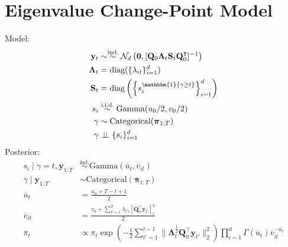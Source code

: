 \documentclass{article}
\newcommand\indep{\perp\!\!\!\perp}
\begin{document}
\section{Eigenvalue Change-Point Model}
Model:
\begin{align*}
    \mathbf{y}_t &\sim \overset{\text{ind.}}{\sim} \mathcal{N}_d \left(\mathbf{0}, [\mathbf{Q}_0 \boldsymbol{\Lambda}_t\mathbf{S}_t\mathbf{Q}_0^\intercal]^{-1}\right) \\
    \boldsymbol{\Lambda}_t &= \text{diag}(\{\lambda_{it} \}_{i=1}^d) \\
    \mathbf{S}_t &= \text{diag}\left(\left\{s_i^{\mathbbm{1}\{\gamma \geq t\}}\right\}_{i=1}^d\right) \\
    s_i &\overset{\text{i.i.d.}}{\sim} \text{Gamma}(u_0/2, v_0/2) \\
    \gamma &\sim \text{Categorical}(\boldsymbol{\pi}_{1:T}) \\
    \gamma &\indep \{s_i\}_{i=1}^d 
\end{align*}
Posterior:
\begin{align*}
    s_i \;|\; \gamma = t, \mathbf{y}_{1:T} &\overset{\text{ind.}}{\sim} \text{Gamma}(\overline{u}_t, \overline{v}_{it}) \\
    \gamma \;|\; \mathbf{y}_{1:T} &\sim \text{Categorical}(\overline{\boldsymbol{\pi}}_{1:T}) \\
    \overline{u}_t &= \frac{u_0 + T-t+1}{2} \\
    \overline{v}_{it} &= \frac{v_0 + \sum_{t'=t}^T \lambda_{t'i}[\mathbf{Q}^\intercal_0\mathbf{y}_{t'}]^2_{i}}{2} \\
    \overline{\pi}_t &\propto \pi_t \exp\left(-\frac{1}{2}\sum_{t'=1}^{t-1} \lVert\boldsymbol{\Lambda}^{\frac{1}{2}}_{t}\mathbf{Q}_0^\intercal\mathbf{y}_{t'}\rVert^2_2\right)\prod_{i=1}^d \Gamma(\overline{u}_t) \overline{v}_{it}^{-\overline{u}_t}
\end{align*}
\small
\end{document}
